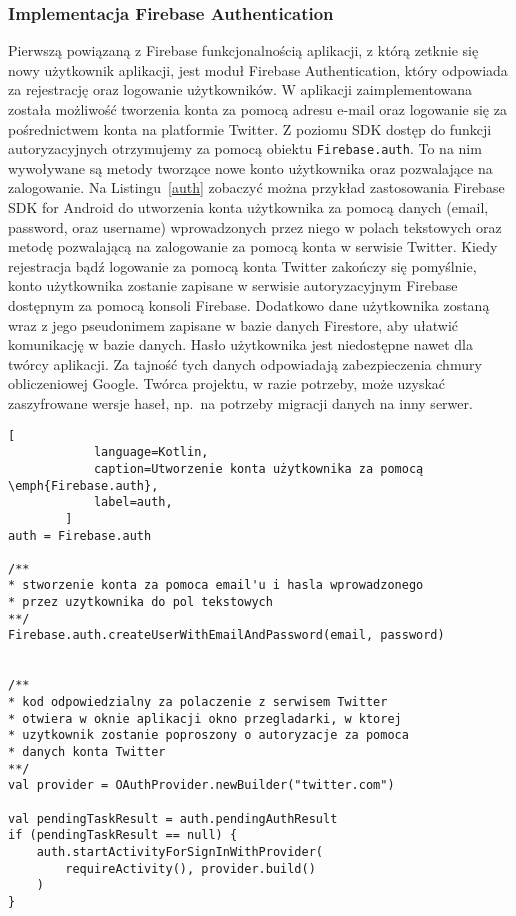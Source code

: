         \subsubsection{Implementacja Firebase Authentication}
        Pierwszą powiązaną z Firebase funkcjonalnością aplikacji, z którą zetknie się nowy użytkownik aplikacji, jest moduł Firebase Authentication, który odpowiada za rejestrację oraz logowanie użytkowników.
        W aplikacji zaimplementowana została możliwość tworzenia konta za pomocą adresu e-mail oraz logowanie się za pośrednictwem konta na platformie Twitter. Z poziomu SDK dostęp do funkcji autoryzacyjnych
        otrzymujemy za pomocą obiektu \texttt{Firebase.auth}. To na nim wywoływane są metody tworzące nowe konto użytkownika oraz pozwalające na zalogowanie. Na Listingu~\ref{auth} zobaczyć można przykład
        zastosowania Firebase SDK for Android do utworzenia konta użytkownika za pomocą danych (email, password, oraz username) wprowadzonych przez niego w polach tekstowych oraz metodę pozwalającą
        na zalogowanie za pomocą konta w serwisie Twitter. Kiedy rejestracja bądź logowanie za pomocą konta Twitter zakończy się pomyślnie, konto użytkownika zostanie zapisane w serwisie autoryzacyjnym
        Firebase dostępnym za pomocą konsoli Firebase. Dodatkowo dane użytkownika zostaną wraz z jego pseudonimem zapisane w bazie danych Firestore, aby ułatwić komunikację w bazie danych.
        Hasło użytkownika jest niedostępne nawet dla twórcy aplikacji. Za  tajność tych danych odpowiadają zabezpieczenia chmury obliczeniowej Google. Twórca projektu, w razie potrzeby,
        może uzyskać zaszyfrowane wersje haseł, np.\ na potrzeby migracji danych na inny serwer.

\newpage
        \begin{lstlisting}[
            language=Kotlin, 
            caption=Utworzenie konta użytkownika za pomocą \emph{Firebase.auth}, 
            label=auth,
        ]
auth = Firebase.auth

/** 
* stworzenie konta za pomoca email'u i hasla wprowadzonego 
* przez uzytkownika do pol tekstowych 
**/
Firebase.auth.createUserWithEmailAndPassword(email, password)


/**
* kod odpowiedzialny za polaczenie z serwisem Twitter
* otwiera w oknie aplikacji okno przegladarki, w ktorej
* uzytkownik zostanie poproszony o autoryzacje za pomoca
* danych konta Twitter 
**/
val provider = OAuthProvider.newBuilder("twitter.com")

val pendingTaskResult = auth.pendingAuthResult
if (pendingTaskResult == null) {
    auth.startActivityForSignInWithProvider(
        requireActivity(), provider.build()
    )
}
        \end{lstlisting}
        \vspace{0.5cm}

